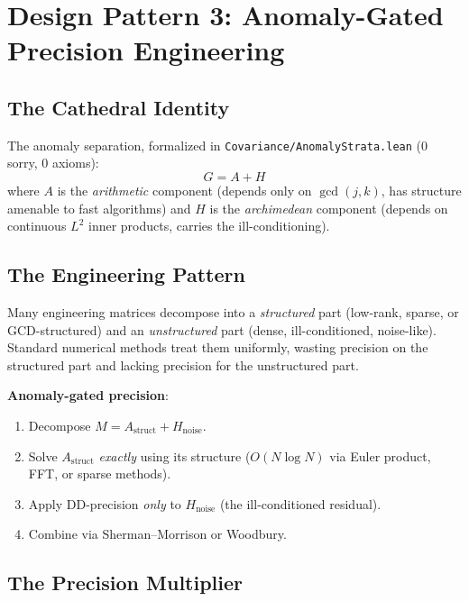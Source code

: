 \documentclass[11pt,a4paper]{article}
\begin{document}
\section{Design Pattern 3: Anomaly-Gated Precision Engineering}
\label{sec:anomaly}

\subsection{The Cathedral Identity}

The anomaly separation, formalized in
\texttt{Covariance/AnomalyStrata.lean} (0 sorry, 0 axioms):
\begin{equation}
  G = A + H
\end{equation}
where $A$ is the \emph{arithmetic} component (depends only on
$\gcd(j,k)$, has structure amenable to fast algorithms) and
$H$ is the \emph{archimedean} component (depends on continuous
$L^2$ inner products, carries the ill-conditioning).

\subsection{The Engineering Pattern}

Many engineering matrices decompose into a \emph{structured} part
(low-rank, sparse, or GCD-structured) and an \emph{unstructured}
part (dense, ill-conditioned, noise-like). Standard numerical
methods treat them uniformly, wasting precision on the structured
part and lacking precision for the unstructured part.

\textbf{Anomaly-gated precision}:
\begin{enumerate}
  \item Decompose $M = A_{\text{struct}} + H_{\text{noise}}$.
  \item Solve $A_{\text{struct}}$ \emph{exactly} using its structure
    ($O(N \log N)$ via Euler product, FFT, or sparse methods).
  \item Apply DD-precision \emph{only} to $H_{\text{noise}}$ (the
    ill-conditioned residual).
  \item Combine via Sherman--Morrison or Woodbury.
\end{enumerate}

\subsection{The Precision Multiplier}
\end{document}
